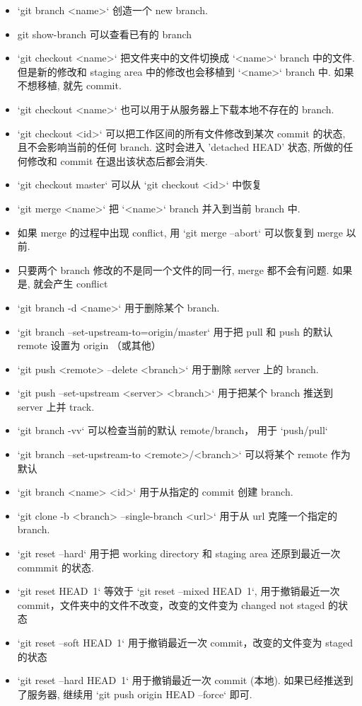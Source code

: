 \begin{itemize}
\item `git branch <name>` 创造一个 new branch.
\item git show-branch 可以查看已有的 branch
\item `git checkout <name>` 把文件夹中的文件切换成 `<name>` branch 中的文件. 但是新的修改和 staging area 中的修改也会移植到 `<name>` branch 中. 如果不想移植, 就先 commit.
\item `git checkout <name>` 也可以用于从服务器上下载本地不存在的 branch.
\item `git checkout <id>` 可以把工作区间的所有文件修改到某次 commit 的状态, 且不会影响当前的任何 branch. 这时会进入 'detached HEAD' 状态, 所做的任何修改和 commit 在退出该状态后都会消失.
\item `git checkout master` 可以从 `git checkout <id>` 中恢复
\item `git merge <name>` 把 `<name>` branch 并入到当前 branch 中.
\item 如果 merge 的过程中出现 conflict, 用 `git merge --abort` 可以恢复到 merge 以前.
\item 只要两个 branch 修改的不是同一个文件的同一行, merge 都不会有问题. 如果是, 就会产生 conflict
\item `git branch -d <name>` 用于删除某个 branch.
\item `git branch --set-upstream-to=origin/master` 用于把 pull 和 push 的默认 remote 设置为 origin （或其他）
\item `git push <remote> --delete <branch>` 用于删除 server 上的 branch.
\item `git push --set-upstream <server> <branch>` 用于把某个 branch 推送到 server 上并 track.
\item `git branch -vv` 可以检查当前的默认 remote/branch， 用于 `push/pull`
\item `git branch --set-upstream-to <remote>/<branch>` 可以将某个 remote 作为默认
\item `git branch <name> <id>` 用于从指定的 commit 创建 branch.
\item `git clone -b <branch> --single-branch <url>` 用于从 url 克隆一个指定的 branch.
\item `git reset --hard` 用于把 working directory 和 staging area 还原到最近一次 commmit 的状态.
\item `git reset HEAD~1` 等效于 `git reset --mixed HEAD~1`, 用于撤销最近一次 commit，文件夹中的文件不改变，改变的文件变为 changed not staged 的状态
\item `git reset --soft HEAD~1` 用于撤销最近一次 commit，改变的文件变为 staged 的状态
\item `git reset --hard HEAD~1` 用于撤销最近一次 commit (本地). 如果已经推送到了服务器, 继续用 `git push origin HEAD --force` 即可.

\end{itemize}
